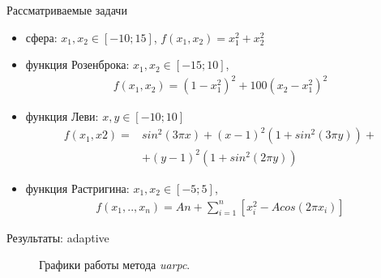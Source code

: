 \documentclass[hyperref=unicode,graphics=pdflatex,13pt]{beamer}
\begin{document}
\begin{frame}{Рассматриваемые задачи}
	\begin{itemize}
		\item сфера:  $x_1, x_2 \in [-10; 15]$, $f(x_1, x_2) =x_1^2 + x_2^2$
		\item функция Розенброка: $x_1, x_2 \in [-15; 10]$, 
			\begin{align}
				f(x_1, x_2) = (1 - x_1^2)^2 + 100(x_2 - x_1^2)^2 \nonumber
			\end{align}
		\item функция Леви:  $x, y \in [-10; 10]$
			\begin{align}
				f(x_1, x2) = &sin^2(3\pi x) + (x - 1)^2(1 + sin^2(3\pi y)) + \nonumber\\
				& + (y - 1)^2(1 + sin^2(2\pi y)) \nonumber
			\end{align}
		\item функция Растригина: $x_1, x_2 \in [-5; 5]$,
			\begin{align}
				f(x_1, .., x_n) = An + \sum\limits_{i = 1}^n\left[ x_i^2 - Acos\left(2 \pi x_i \right)\right] \nonumber
			\end{align}
	\end{itemize}
\end{frame}

\begin{frame}{Результаты: adaptive}
	 \begin{figure}
	  \centering
	  \caption{ Графики работы метода \textit{uarpc}.}
	\end{figure}
\end{frame}
\end{document}

